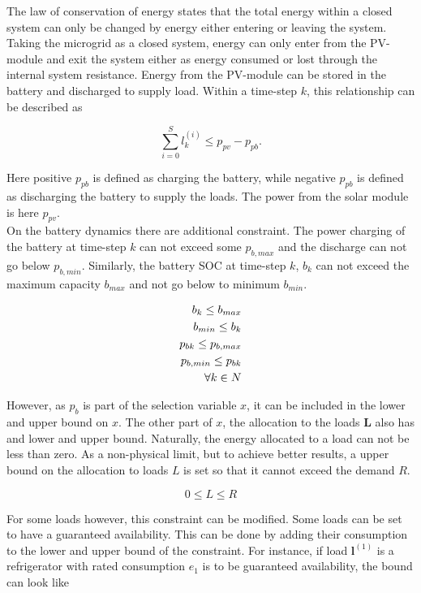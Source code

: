 The law of conservation of energy states that the total energy within a closed system can only be changed by energy either entering or leaving the system. Taking the microgrid as a closed system, energy can only enter from the PV-module and exit the system either as energy consumed or lost through the internal system resistance. Energy from the PV-module can be stored in the battery and discharged to supply load. Within a time-step $k$, this relationship can be described as 

\begin{equation}
    \sum_{i=0}^S l_k^{(i)} \leq p_{pv} - p_{pb}.
    \label{eq:energy_balance}
\end{equation}

Here positive $p_{pb}$ is defined as charging the battery, while negative $p_{pb}$ is defined as discharging the battery to supply the loads. The power from the solar module is here $p_{pv}$.\\

On the battery dynamics there are additional constraint. The power charging of the battery at time-step $k$ can not exceed some $p_{b,max}$ and the discharge can not go below $p_{b,min}$. Similarly, the battery SOC at time-step $k$, $b_k$ can not exceed the maximum capacity $b_{max}$ and not go below to minimum $b_{min}$. 

\begin{align}
    b_k \leq b_{max}\\
    b_{min} \leq b_k\\
    p_{bk} \leq p_{b,max}\\
    p_{b,min} \leq p_{bk}\\
    \forall k \in N \notag
\end{align}

However, as $p_b$ is part of the selection variable $x$, it can be included in the lower and upper bound on $x$. The other part of $x$, the allocation to the loads $\mathbf{L}$ also has and lower and upper bound. Naturally, the energy allocated to a load can not be less than zero. As a non-physical limit, but to achieve better results, a upper bound on the allocation to loads $L$ is set so that it cannot exceed the demand $R$. 

\begin{equation}
    0 \leq L \leq R
\end{equation}

For some loads however, this constraint can be modified. Some loads can be set to have a guaranteed availability. This can be done by adding their consumption to the lower and upper bound of the constraint. For instance, if load $\mathbf{l}^{(1)}$ is a refrigerator with rated consumption $e_1$ is to be guaranteed availability, the bound can look like

